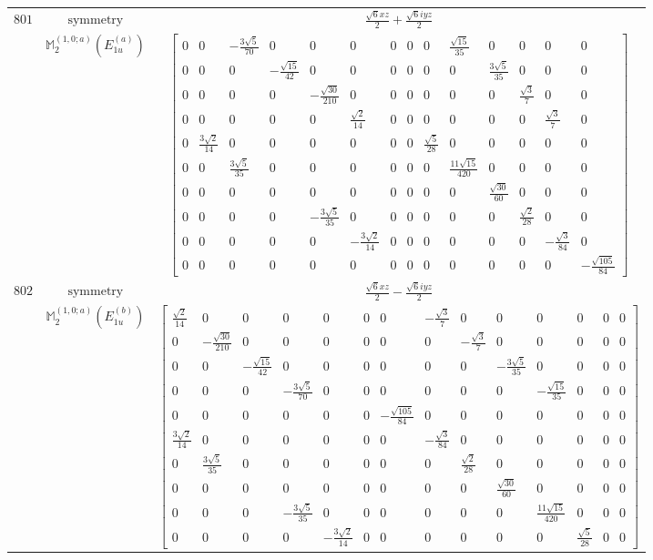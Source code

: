 \documentclass[fleqn,8pt,landscape]{jsarticle}
\begin{document}
\begin{longtable}{ccc}
$ 801 $ & $ \text{symmetry} $ & $ \frac{\sqrt{6} x z}{2} + \frac{\sqrt{6} i y z}{2} $ \\
$  $ & $ \mathbb{M}_{2}^{(1,0;a)}(E_{1u}^{(a)}) $ & $ \begin{bmatrix} 0 & 0 & - \frac{3 \sqrt{5}}{70} & 0 & 0 & 0 & 0 & 0 & 0 & \frac{\sqrt{15}}{35} & 0 & 0 & 0 & 0 \\ 0 & 0 & 0 & - \frac{\sqrt{15}}{42} & 0 & 0 & 0 & 0 & 0 & 0 & \frac{3 \sqrt{5}}{35} & 0 & 0 & 0 \\ 0 & 0 & 0 & 0 & - \frac{\sqrt{30}}{210} & 0 & 0 & 0 & 0 & 0 & 0 & \frac{\sqrt{3}}{7} & 0 & 0 \\ 0 & 0 & 0 & 0 & 0 & \frac{\sqrt{2}}{14} & 0 & 0 & 0 & 0 & 0 & 0 & \frac{\sqrt{3}}{7} & 0 \\ 0 & \frac{3 \sqrt{2}}{14} & 0 & 0 & 0 & 0 & 0 & 0 & \frac{\sqrt{5}}{28} & 0 & 0 & 0 & 0 & 0 \\ 0 & 0 & \frac{3 \sqrt{5}}{35} & 0 & 0 & 0 & 0 & 0 & 0 & \frac{11 \sqrt{15}}{420} & 0 & 0 & 0 & 0 \\ 0 & 0 & 0 & 0 & 0 & 0 & 0 & 0 & 0 & 0 & \frac{\sqrt{30}}{60} & 0 & 0 & 0 \\ 0 & 0 & 0 & 0 & - \frac{3 \sqrt{5}}{35} & 0 & 0 & 0 & 0 & 0 & 0 & \frac{\sqrt{2}}{28} & 0 & 0 \\ 0 & 0 & 0 & 0 & 0 & - \frac{3 \sqrt{2}}{14} & 0 & 0 & 0 & 0 & 0 & 0 & - \frac{\sqrt{3}}{84} & 0 \\ 0 & 0 & 0 & 0 & 0 & 0 & 0 & 0 & 0 & 0 & 0 & 0 & 0 & - \frac{\sqrt{105}}{84} \end{bmatrix} $ \\ \hline
$ 802 $ & $ \text{symmetry} $ & $ \frac{\sqrt{6} x z}{2} - \frac{\sqrt{6} i y z}{2} $ \\
$  $ & $ \mathbb{M}_{2}^{(1,0;a)}(E_{1u}^{(b)}) $ & $ \begin{bmatrix} \frac{\sqrt{2}}{14} & 0 & 0 & 0 & 0 & 0 & 0 & - \frac{\sqrt{3}}{7} & 0 & 0 & 0 & 0 & 0 & 0 \\ 0 & - \frac{\sqrt{30}}{210} & 0 & 0 & 0 & 0 & 0 & 0 & - \frac{\sqrt{3}}{7} & 0 & 0 & 0 & 0 & 0 \\ 0 & 0 & - \frac{\sqrt{15}}{42} & 0 & 0 & 0 & 0 & 0 & 0 & - \frac{3 \sqrt{5}}{35} & 0 & 0 & 0 & 0 \\ 0 & 0 & 0 & - \frac{3 \sqrt{5}}{70} & 0 & 0 & 0 & 0 & 0 & 0 & - \frac{\sqrt{15}}{35} & 0 & 0 & 0 \\ 0 & 0 & 0 & 0 & 0 & 0 & - \frac{\sqrt{105}}{84} & 0 & 0 & 0 & 0 & 0 & 0 & 0 \\ \frac{3 \sqrt{2}}{14} & 0 & 0 & 0 & 0 & 0 & 0 & - \frac{\sqrt{3}}{84} & 0 & 0 & 0 & 0 & 0 & 0 \\ 0 & \frac{3 \sqrt{5}}{35} & 0 & 0 & 0 & 0 & 0 & 0 & \frac{\sqrt{2}}{28} & 0 & 0 & 0 & 0 & 0 \\ 0 & 0 & 0 & 0 & 0 & 0 & 0 & 0 & 0 & \frac{\sqrt{30}}{60} & 0 & 0 & 0 & 0 \\ 0 & 0 & 0 & - \frac{3 \sqrt{5}}{35} & 0 & 0 & 0 & 0 & 0 & 0 & \frac{11 \sqrt{15}}{420} & 0 & 0 & 0 \\ 0 & 0 & 0 & 0 & - \frac{3 \sqrt{2}}{14} & 0 & 0 & 0 & 0 & 0 & 0 & \frac{\sqrt{5}}{28} & 0 & 0 \end{bmatrix} $ \\ \hline

\end{longtable}
\end{document}
